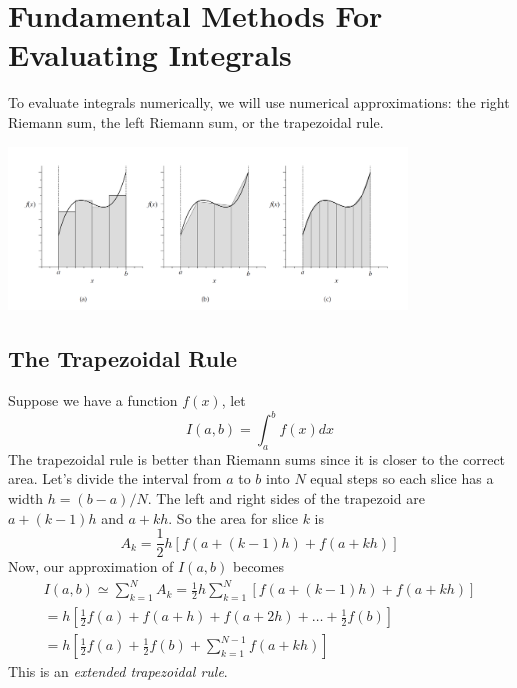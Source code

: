 \section{Fundamental Methods For Evaluating Integrals}
    To evaluate integrals numerically, we will use numerical approximations: the right Riemann sum, the left Riemann sum, or the trapezoidal rule.
    \begin{center}
        \includegraphics[width=300pt]{integral_approx.png}
    \end{center}
    \subsection{The Trapezoidal Rule}
        Suppose we have a function $f(x)$, let
        \begin{equation*}
            I(a, b) = \int_a^b f(x) dx
        \end{equation*}
        The trapezoidal rule is better than Riemann sums since it is closer to the correct area. Let's divide the interval from $a$ to $b$ into $N$ equal steps so each slice has a width $h = (b - a) / N$. The left and right sides of the trapezoid are $a + (k - 1) h$ and $a + kh$. So the area for slice $k$ is
        \begin{equation*}
            A_k = \frac{1}{2}h[f(a + (k - 1)h) + f(a + kh)]
        \end{equation*}
        Now, our approximation of $I(a, b)$ becomes
        \begin{align*}
            I(a, b) \simeq \sum_{k=1}^N A_k = \frac{1}{2}h \sum_{k=1}^N [f(a + (k - 1)h) + f(a + kh)] \\
            = h[\frac{1}{2}f(a) + f(a + h) + f(a + 2h) + \dots + \frac{1}{2}f(b)] \\
            = h[\frac{1}{2}f(a) + \frac{1}{2}f(b) + \sum_{k=1}^{N-1}f(a + kh)]
        \end{align*}
        This is an \textit{extended trapezoidal rule}.

